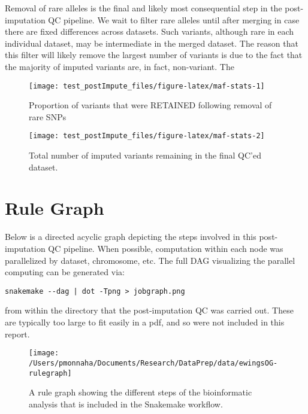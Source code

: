 \documentclass[]{article}
\begin{document}
Removal of rare alleles is the final and likely most consequential step
in the post-imputation QC pipeline. We wait to filter rare alleles until
after merging in case there are fixed differences across datasets. Such
variants, although rare in each individual dataset, may be intermediate
in the merged dataset. The reason that this filter will likely remove
the largest number of variants is due to the fact that the majority of
imputed variants are, in fact, non-variant. The

\begin{figure}[H]

{\centering \texttt{[image: test\_postImpute\_files/figure-latex/maf-stats-1]} 

}

\caption{Proportion of variants that were RETAINED following removal of rare SNPs}\label{fig:maf-stats1}
\end{figure}
\begin{figure}[H]

{\centering \texttt{[image: test\_postImpute\_files/figure-latex/maf-stats-2]} 

}

\caption{Total number of imputed variants remaining in the final QC'ed dataset.}\label{fig:maf-stats2}
\end{figure}
\newpage

\hypertarget{rule-graph}{%
\section{Rule Graph}\label{rule-graph}}

Below is a directed acyclic graph depicting the steps involved in this
post-imputation QC pipeline. When possible, computation within each node
was parallelized by dataset, chromosome, etc. The full DAG visualizing
the parallel computing can be generated via:

\begin{verbatim}
snakemake --dag | dot -Tpng > jobgraph.png
\end{verbatim}

from within the directory that the post-imputation QC was carried out.
These are typically too large to fit easily in a pdf, and so were not
included in this report.

\begin{figure}[H]

{\centering \texttt{[image: /Users/pmonnaha/Documents/Research/DataPrep/data/ewingsOG-rulegraph]} 

}

\caption{A rule graph showing the different steps of the bioinformatic analysis that is included in the Snakemake workflow.}\label{fig:unnamed-chunk-1}
\end{figure}
\end{document}
